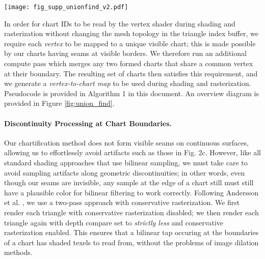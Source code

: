 \begin{figure*}
\vspace{-10pt}
\texttt{[image: fig\_supp\_unionfind\_v2.pdf]}
\caption{GPU Union Find. Given each triangle labelled with its starting index, we first initialize by linking each triangle to its neighbor of lowest index (a) through the half-edge data structure. Triangles are then hooked together such that each has a path to the root triangle (b). We then initialize a mapping from vertices to triangle roots by writing to each vertex the minimum root of its connected triangles (c). Finally, we perform another connection step through the initialized vertex roots (d) and then flatten the entire data structure to point to the global root (e), which is then recorded as the root triangle for the newly formed chart.}
\vspace{-10pt}
\label{fig:union_find}
\end{figure*}

In order for chart IDs to be read by the vertex shader during shading and rasterization without changing the mesh topology in the triangle index buffer, we require each {\em vertex} to be mapped to a unique visible chart; this is made possible by our charts having seams at visible borders. We therefore run an additional compute pass which merges any two formed charts that share a common vertex at their boundary. The resulting set of charts then satisfies this requirement, and we generate a {\em vertex-to-chart map} to be used during shading and rasterization. Pseudocode is provided in Algorithm 1 in this document. An overview diagram is provided in Figure \ref{fig:union_find}.

\paragraph{Discontinuity Processing at Chart Boundaries.} Our chartification method does not form visible seams on continuous surfaces, allowing us to effortlessly avoid artifacts such as those in Fig. 2c. However, like all standard shading approaches that use bilinear sampling, we must take care to avoid sampling artifacts along geometric discontinuities; in other words, even though our seams are invisible, any sample at the edge of a chart still must still have a plausible color for bilinear filtering to work correctly. Following Andersson et al. \cite{andersson2014adaptive}, we use a two-pass approach with conservative rasterization. We first render each triangle with conservative rasterization disabled; we then render each triangle again with depth compare set to {\em strictly less} and conservative rasterization enabled. This ensures that a bilinear tap occuring at the boundaries of a chart has shaded texels to read from, without the problems of image dilation methods.

